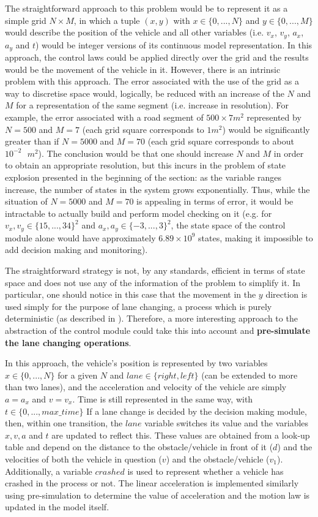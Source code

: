 The straightforward approach to this problem would be to represent it as a simple grid $N\times M$, in which a tuple $(x,y)$ with $x\in \{0,...,N\}$ and $y\in \{0,...,M\}$ would describe the position of the vehicle and all other variables (i.e. $v_x$, $v_y$, $a_x$, $a_y$ and $t$) would be integer versions of its continuous model representation. In this approach, the control laws could be applied directly over the grid and the results would be the movement of the vehicle in it. However, there is an intrinsic problem with this approach. The error associated with the use of the grid as a way to discretise space would, logically, be reduced with an increase of the $N$ and $M$ for a representation of the same segment (i.e. increase in resolution). For example, the error associated with a road segment of $500 \times 7m^2$ represented by $N = 500$ and $M = 7$ (each grid square corresponds to $1m^2$) would be significantly greater than if $N = 5000$ and $M = 70$ (each grid square corresponds to about $10^{-2}\text{ }m^2$). The conclusion would be that one should increase $N$ and $M$ in order to obtain an appropriate resolution, but this incurs in the problem of state explosion presented in the beginning of the section: as the variable ranges increase, the number of states in the system grows exponentially. Thus, while the situation of $N = 5000$ and $M = 70$ is appealing in terms of error, it would be intractable to actually build and perform model checking on it (e.g. for $v_x, v_y \in \{15,...,34\}^2$ and $a_x, a_y \in \{-3,...,3\}^2$, the state space of the control module alone would have approximately $6.89\times 10^{9}$ states, making it impossible to add decision making and monitoring). 

The straightforward strategy is not, by any standards, efficient in terms of state space and does not use any of the information of the problem to simplify it. In particular, one should notice in this case that the movement in the $y$ direction is used simply for the purpose of lane changing, a process which is purely deterministic (as described in \cite{salvucci_1}). Therefore, a more interesting approach to the abstraction of the control module could take this into account and \textbf{pre-simulate the lane changing operations}.

In this approach, the vehicle's position is represented by two variables $x \in \{0,...,N\}$ for a given $N$ and $lane \in \{right, left\}$ (can be extended to more than two lanes), and the acceleration and velocity of the vehicle are simply $a = a_x$ and $v = v_x$. Time is still represented in the same way, with $t \in \{0,...,max\_time\}$ If a lane change is decided by the decision making module, then, within one transition, the $lane$ variable switches its value and the variables $x, v, a$ and $t$ are updated to reflect this. These values are obtained from a look-up table and depend on the distance to the obstacle/vehicle in front of it ($d$) and the velocities of both the vehicle in question ($v$) and the obstacle/vehicle ($v_1$). Additionally, a variable $crashed$ is used to represent whether a vehicle has crashed in the process or not. The linear acceleration is implemented similarly using pre-simulation to determine the value of acceleration and the motion law is updated in the model itself.


